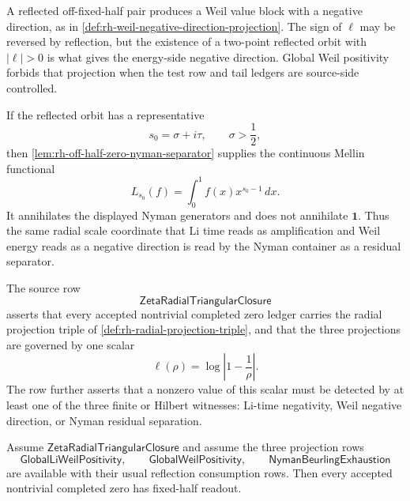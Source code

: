 \begin{principle}
\label{prin:rh-energy-projection-nonzero-radial-scale}
A reflected off-fixed-half pair produces a Weil value block with a
negative direction, as in
\autoref{def:rh-weil-negative-direction-projection}.  The sign of
$\ell$ may be reversed by reflection, but the existence of a two-point
reflected orbit with $|\ell|>0$ is what gives the energy-side negative
direction.  Global Weil positivity forbids that projection when the
test row and tail ledgers are source-side controlled.
\end{principle}

\begin{principle}
\label{prin:rh-container-projection-nonzero-radial-scale}
If the reflected orbit has a representative
$$
s_0=\sigma+i\tau,
\qquad
\sigma>\frac12,
$$
then \autoref{lem:rh-off-half-zero-nyman-separator} supplies the
continuous Mellin functional
$$
L_{s_0}(f)=\int_0^1 f(x)x^{s_0-1}\,dx.
$$
It annihilates the displayed Nyman generators and does not annihilate
$\mathbf 1$.  Thus the same radial scale coordinate that Li time reads
as amplification and Weil energy reads as a negative direction is read
by the Nyman container as a residual separator.
\end{principle}

\begin{definition}
\label{def:rh-zeta-radial-triangular-closure}
The source row
$$
\mathsf{ZetaRadialTriangularClosure}
$$
asserts that every accepted nontrivial completed zero ledger carries
the radial projection triple of
\autoref{def:rh-radial-projection-triple}, and that the three
projections are governed by one scalar
$$
\ell(\rho)=\log\left|1-\frac1\rho\right|.
$$
The row further asserts that a nonzero value of this scalar must be
detected by at least one of the three finite or Hilbert witnesses:
Li-time negativity, Weil negative direction, or Nyman residual
separation.
\end{definition}

\begin{theorem}
\label{thm:rh-radial-triangular-closure-fixed-half-readout}
Assume $\mathsf{ZetaRadialTriangularClosure}$ and assume the three
projection rows
$$
\mathsf{GlobalLiWeilPositivity},
\qquad
\mathsf{GlobalWeilPositivity},
\qquad
\mathsf{NymanBeurlingExhaustion}
$$
are available with their usual reflection consumption rows.  Then every
accepted nontrivial completed zero has fixed-half readout.
\end{theorem}

